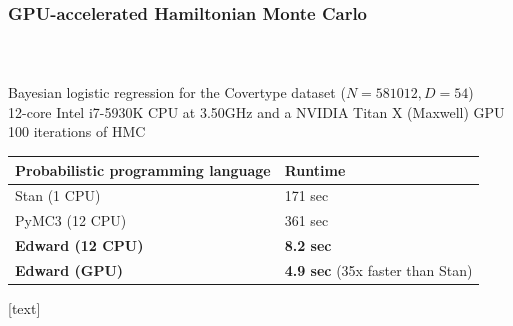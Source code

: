 \documentclass[10pt]{beamer}
\begin{document}
\begin{frame}
\frametitle{GPU-accelerated Hamiltonian Monte Carlo}
\vspace{1ex}
\begin{columns}
  \begin{column}{0.25\textwidth}
    
  \end{column}
  \begin{column}{0.75\textwidth}
    \inputminted[fontsize=\scriptsize]{python}{python/bayesian_logistic_regression.py}
  \end{column}
\end{columns}
\vspace{1ex}

Bayesian logistic regression for the Covertype dataset ($N=581012, D=54$) \\
12-core Intel i7-5930K CPU at 3.50GHz and a NVIDIA Titan X (Maxwell) GPU \\
100 iterations of HMC
\vspace{1ex}

\begin{table}[tb]
\centering
\begin{tabular}{ll}
\toprule
Probabilistic programming language & Runtime
\\
\midrule
Stan (1 CPU) & 171 sec \\
PyMC3 (12 CPU) & 361 sec \\
\textbf{Edward (12 CPU)} & \textbf{8.2 sec} \\
\textbf{Edward (GPU)} & \textbf{4.9 sec} (35x faster than Stan)\\
\bottomrule
\end{tabular}
\end{table}
\citep{carpenter_stan_2017, salvatier_probabilistic_2015}
\end{frame}


\begin{frame}[allowframebreaks]  %
  [text]
  \renewcommand*{\bibfont}{\small}
  \printbibliography
\end{frame}
\end{document}
